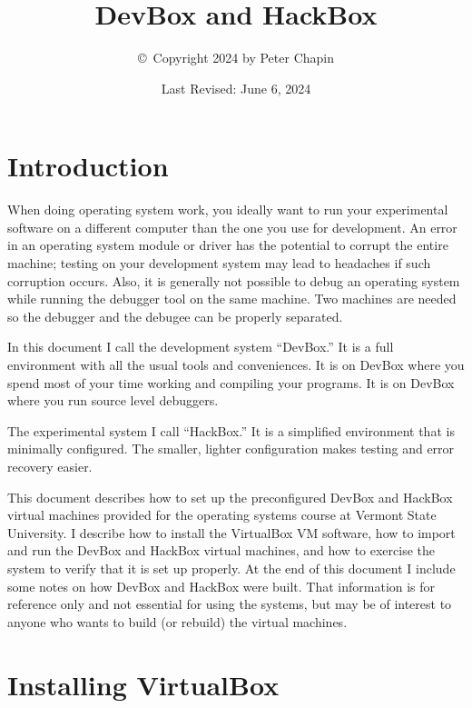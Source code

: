 \documentclass[twocolumn]{article}
\begin{document}
\title{DevBox and HackBox}
\author{\copyright\ Copyright 2024 by Peter Chapin}
\date{Last Revised: June 6, 2024}
\maketitle

\tableofcontents

\section{Introduction}

When doing operating system work, you ideally want to run your experimental software on a
different computer than the one you use for development. An error in an operating system module
or driver has the potential to corrupt the entire machine; testing on your development system
may lead to headaches if such corruption occurs. Also, it is generally not possible to debug an
operating system while running the debugger tool on the same machine. Two machines are needed so
the debugger and the debugee can be properly separated.

In this document I call the development system ``DevBox.'' It is a full environment with all the
usual tools and conveniences. It is on DevBox where you spend most of your time working and
compiling your programs. It is on DevBox where you run source level debuggers.

The experimental system I call ``HackBox.'' It is a simplified environment that is minimally
configured. The smaller, lighter configuration makes testing and error recovery easier.

This document describes how to set up the preconfigured DevBox and HackBox virtual machines
provided for the operating systems course at Vermont State University. I describe how to install
the VirtualBox VM software, how to import and run the DevBox and HackBox virtual machines, and
how to exercise the system to verify that it is set up properly. At the end of this document I
include some notes on how DevBox and HackBox were built. That information is for reference only
and not essential for using the systems, but may be of interest to anyone who wants to build (or
rebuild) the virtual machines.

\section{Installing VirtualBox}
\end{document}
